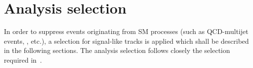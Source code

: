 \section{Analysis selection}
\label{sec:AnalysisSelection}

In order to suppress events originating from SM processes (such as QCD-multijet events, \WJets, etc.), a selection for signal-like tracks is applied which shall be described in the following sections.
The analysis selection follows closely the selection required in~\cite{bib:CMS:DT_Thesis,bib:CMS:DT_8TeV_AN}.\\

